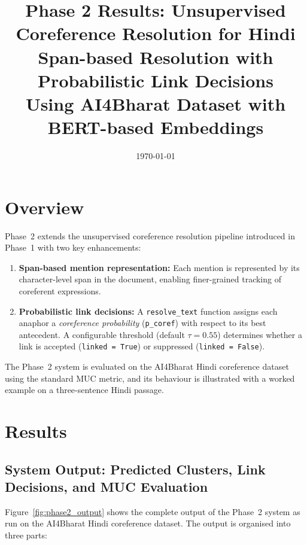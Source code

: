 \documentclass[12pt,a4paper]{article}
\title{
    \textbf{Phase 2 Results: Unsupervised Coreference Resolution for Hindi} \\[0.5em]
    \large Span-based Resolution with Probabilistic Link Decisions \\[0.3em]
    \normalsize Using AI4Bharat Dataset with BERT-based Embeddings
}
\date{\today}
\begin{document}
\maketitle
\newpage

\section{Overview}

Phase~2 extends the unsupervised coreference resolution pipeline
introduced in Phase~1 with two key enhancements:

\begin{enumerate}
    \item \textbf{Span-based mention representation:} Each mention is
          represented by its character-level span in the document, enabling
          finer-grained tracking of coreferent expressions.
    \item \textbf{Probabilistic link decisions:} A \texttt{resolve\_text}
          function assigns each anaphor a \textit{coreference probability}
          (\texttt{p\_coref}) with respect to its best antecedent. A
          configurable threshold (default $\tau = 0.55$) determines whether
          a link is accepted (\texttt{linked = True}) or suppressed
          (\texttt{linked = False}).
\end{enumerate}

The Phase~2 system is evaluated on the AI4Bharat Hindi coreference
dataset using the standard MUC metric, and its behaviour is illustrated
with a worked example on a three-sentence Hindi passage.

\section{Results}

\subsection{System Output: Predicted Clusters, Link Decisions, and MUC Evaluation}

Figure~\ref{fig:phase2_output} shows the complete output of the Phase~2
system as run on the AI4Bharat Hindi coreference dataset. The output is
organised into three parts:
\end{document}
